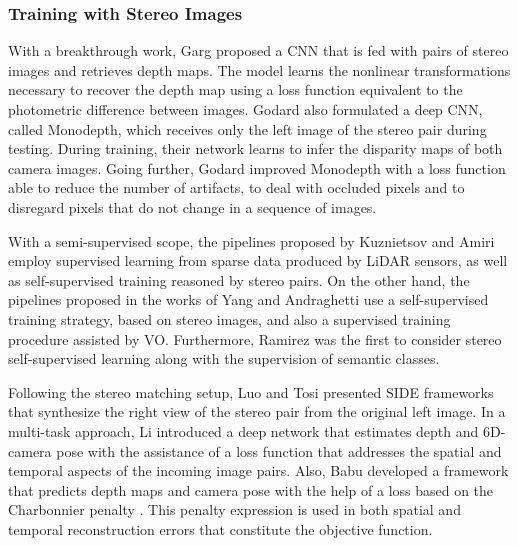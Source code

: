 \documentclass[5p]{elsarticle}
\begin{document}
\subsubsection{Training with Stereo Images}

With a breakthrough work, Garg \etal \cite{garg2016unsupervised} proposed a CNN that is fed with pairs of stereo images and retrieves depth maps. The model learns the nonlinear transformations necessary to recover the depth map using a loss function equivalent to the photometric difference between images. Godard \etal \cite{godard2017unsupervised} also formulated a deep CNN, called Monodepth, which receives only the left image of the stereo pair during testing. During training, their network learns to infer the disparity maps of both camera images. Going further, Godard \etal \cite{godard2019digging} improved Monodepth with a loss function able to reduce the number of artifacts, to deal with occluded pixels and to disregard pixels that do not change in a sequence of images.

With a semi-supervised scope, the pipelines proposed by Kuznietsov \etal \cite{kuznietsov2017semi} and Amiri \etal \cite{amiri2019semi} employ supervised learning from sparse data produced by LiDAR sensors, as well as self-supervised training reasoned by stereo pairs. On the other hand, the pipelines proposed in the works of Yang \etal \cite{yang2018deep} and Andraghetti \etal \cite{andraghetti2019enhancing} use a self-supervised training strategy, based on stereo images, and also a supervised training procedure assisted by VO. Furthermore, Ramirez \etal \cite{ramirez2018geometry} was the first to consider stereo self-supervised learning along with the supervision of semantic classes.

Following the stereo matching setup, Luo \etal \cite{luo2018single} and Tosi \etal \cite{tosi2019learning} presented SIDE frameworks that synthesize the right view of the stereo pair from the original left image. In a multi-task approach, Li \etal \cite{li2018undeepvo} introduced a deep network that estimates depth and 6D-camera pose with the assistance of a loss function that addresses the spatial and temporal aspects of the incoming image pairs. Also, Babu \etal \cite{babu2018undemon} developed a framework that predicts depth maps and camera pose with the help of a loss based on the Charbonnier penalty \cite{charbonnier1994two}. This penalty expression is used in both spatial and temporal reconstruction errors that constitute the objective function.
\end{document}
